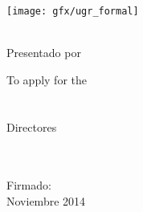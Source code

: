 \begin{titlepage}
    \begin{center}
        \large
        \vspace*{1.5cm}
        \texttt{[image: gfx/ugr\_formal]} \\

        \vspace{1.5cm}

        {\color{ugrOrange}\spacedallcaps{\myTitle}} \\ \bigskip
	{\textcolor{ugrGray} {\small Presentado por}} \\ \bigskip
        \spacedlowsmallcaps{\myName}

        \vspace{1.5cm}
\textcolor{ugrGray}
        {\small To apply for the }\normalsize\\
        \large{} \\ 
        \large{} \\
\vspace{1.5cm}
\textcolor{ugrGray}{\small Directores }\normalsize\\
        \large\spacedlowsmallcaps{\myDirectorOne}\\
        \large\spacedlowsmallcaps{\myDirectorTwo}\\
        \vspace{3cm}

        {\small Firmado: \myName }\\ \bigskip
	Noviembre 2014


    \end{center}
\end{titlepage}   
